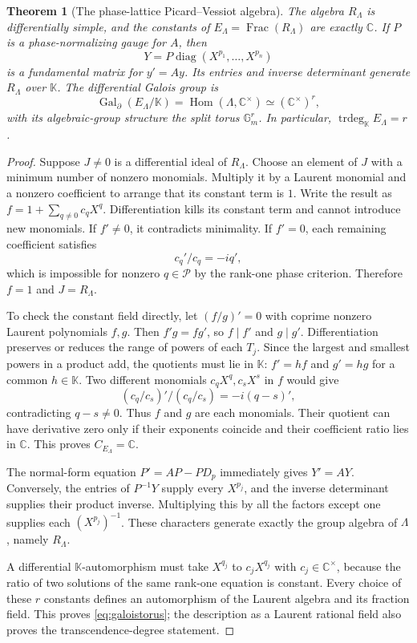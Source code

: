 \documentclass[11pt,a4paper]{article}
\numberwithin{equation}{section}
\newtheorem{theorem}{Theorem}[section]
\theoremstyle{definition}
\theoremstyle{remark}
\newcommand{\K}{\mathbb K}
\newcommand{\C}{\mathbb C}
\newcommand{\PP}{\mathcal P}
\newcommand{\diag}{\operatorname{diag}}
\newcommand{\Hom}{\operatorname{Hom}}
\newcommand{\Frac}{\operatorname{Frac}}
\begin{document}
\begin{theorem}[The phase-lattice Picard--Vessiot algebra]\label{thm:PV}
The algebra $R_\Lambda$ is differentially simple, and the constants of
$E_\Lambda=\Frac(R_\Lambda)$ are exactly $\C$. If $P$ is a phase-normalizing
gauge for $A$, then
\[
 Y=P\diag(X^{p_1},\ldots,X^{p_n})
\]
is a fundamental matrix for $y'=Ay$. Its entries and inverse determinant
generate $R_\Lambda$ over $\K$. The differential Galois group is
\begin{equation}\label{eq:galoistorus}
 \operatorname{Gal}_\partial(E_\Lambda/\K)
   =\Hom(\Lambda,\C^\times)\simeq(\C^\times)^r,
\end{equation}
with its algebraic-group structure the split torus $\mathbb G_m^r$.
In particular, $\operatorname{trdeg}_{\K}E_\Lambda=r$.
\end{theorem}
\begin{proof}
Suppose $J\ne0$ is a differential ideal of $R_\Lambda$. Choose an element
of $J$ with a minimum number of nonzero monomials. Multiply it by a
Laurent monomial and a nonzero coefficient to arrange that its constant
term is $1$. Write the result as $f=1+\sum_{q\ne0}c_qX^q$.
Differentiation kills its constant term and cannot introduce new
monomials. If $f'\ne0$, it contradicts minimality. If $f'=0$, each
remaining coefficient satisfies
\[
 c_q'/c_q=-i q',
\]
which is impossible for nonzero $q\in\PP$ by the rank-one phase
criterion. Therefore $f=1$ and $J=R_\Lambda$.

To check the constant field directly, let $(f/g)'=0$ with coprime
nonzero Laurent polynomials $f,g$. Then $f'g=fg'$, so $f\mid f'$ and
$g\mid g'$. Differentiation preserves or reduces the range of powers of
each $T_j$. Since the largest and smallest powers in a product add,
the quotients must lie in $\K$: $f'=hf$ and $g'=hg$ for a common
$h\in\K$. Two different monomials $c_qX^q,c_sX^s$ in $f$ would give
\[
 (c_q/c_s)'/(c_q/c_s)=-i(q-s)',
\]
contradicting $q-s\ne0$. Thus $f$ and $g$ are each monomials.
Their quotient can have derivative zero only if their exponents coincide
and their coefficient ratio lies in $\C$. This proves
$C_{E_\Lambda}=\C$.

The normal-form equation $P'=AP-PD_p$ immediately gives $Y'=AY$.
Conversely, the entries of $P^{-1}Y$ supply every $X^{p_j}$, and the
inverse determinant supplies their product inverse. Multiplying this by
all the factors except one supplies each $(X^{p_j})^{-1}$. These
characters generate exactly the group algebra of $\Lambda$, namely
$R_\Lambda$.

A differential $\K$-automorphism must take $X^{q_j}$ to
$c_jX^{q_j}$ with $c_j\in\C^\times$, because the ratio of two solutions
of the same rank-one equation is constant. Every choice of these $r$
constants defines an automorphism of the Laurent algebra and its fraction
field. This proves \eqref{eq:galoistorus}; the description as a Laurent
rational field also proves the transcendence-degree statement.
\end{proof}
\end{document}
